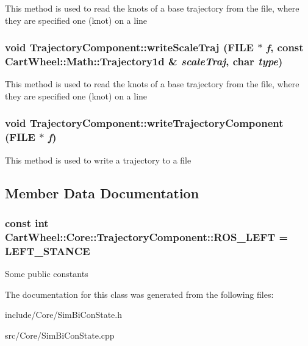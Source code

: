 This method is used to read the knots of a base trajectory from the file, where they are specified one (knot) on a line \hypertarget{classCartWheel_1_1Core_1_1TrajectoryComponent_aacd5934cf7ec5b1e6eb8c564cbec12b1}{
\subsubsection[{writeScaleTraj}]{\setlength{\rightskip}{0pt plus 5cm}void TrajectoryComponent::writeScaleTraj (FILE $\ast$ {\em f}, \/  const {\bf CartWheel::Math::Trajectory1d} \& {\em scaleTraj}, \/  char {\em type})}}
\label{classCartWheel_1_1Core_1_1TrajectoryComponent_aacd5934cf7ec5b1e6eb8c564cbec12b1}
This method is used to read the knots of a base trajectory from the file, where they are specified one (knot) on a line \hypertarget{classCartWheel_1_1Core_1_1TrajectoryComponent_a622bc55af66ccb0ba86f4e8d3b637c21}{
\subsubsection[{writeTrajectoryComponent}]{\setlength{\rightskip}{0pt plus 5cm}void TrajectoryComponent::writeTrajectoryComponent (FILE $\ast$ {\em f})}}
\label{classCartWheel_1_1Core_1_1TrajectoryComponent_a622bc55af66ccb0ba86f4e8d3b637c21}
This method is used to write a trajectory to a file 

\subsection{Member Data Documentation}
\hypertarget{classCartWheel_1_1Core_1_1TrajectoryComponent_ac899396bf7d17c2e1c1d4353f6e33376}{
\subsubsection[{ROS\_\-LEFT}]{\setlength{\rightskip}{0pt plus 5cm}const int {\bf CartWheel::Core::TrajectoryComponent::ROS\_\-LEFT} = LEFT\_\-STANCE}}
\label{classCartWheel_1_1Core_1_1TrajectoryComponent_ac899396bf7d17c2e1c1d4353f6e33376}
Some public constants 

The documentation for this class was generated from the following files:\begin{DoxyCompactItemize}
\item 
include/Core/SimBiConState.h\item 
src/Core/SimBiConState.cpp\end{DoxyCompactItemize}
